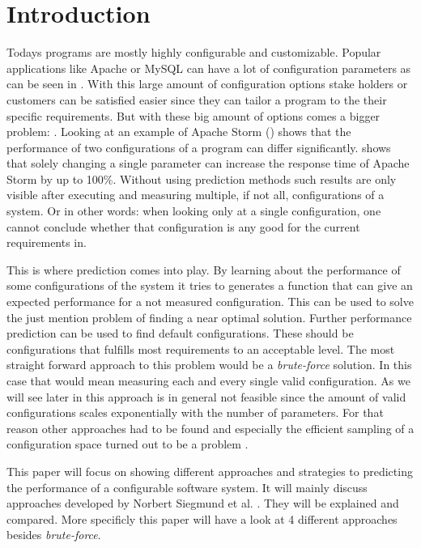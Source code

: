 
\section{Introduction} \label{sec:introduction}
Todays programs are mostly highly configurable and customizable. Popular applications like Apache or MySQL can have a lot of configuration parameters as can be seen in . With this large amount of  configuration options stake holders or customers can be satisfied easier since they can tailor a program to the their specific requirements. But with these big amount of options comes a bigger problem: . Looking at an example of Apache Storm () shows that the performance of two configurations of a program can differ significantly.  shows that solely changing a single parameter can increase the response time of Apache Storm by up to 100\%. Without using prediction methods such results are only visible after executing and measuring multiple, if not all, configurations of a system. Or in other words: when looking only at a single configuration, one cannot conclude whether that configuration is any good for the current requirements in.

This is where prediction comes into play. By learning about the performance of some configurations of the system it tries to generates a function that can give an expected performance for a not measured configuration. This can be used to solve the just mention problem of finding a near optimal solution.
Further performance prediction can be used to find default configurations. These should be configurations that fulfills most requirements to an acceptable level. 
The most straight forward  approach to this problem would be a \textit{brute-force} solution. In this case that would mean measuring each and every single valid configuration. As we will see later in  this approach is in general not feasible since the amount of valid configurations scales exponentially with the number of parameters. For that reason other approaches had to be found and especially the efficient sampling of a configuration space turned out to be a problem \cite{CostEfficientSampling_Gou_Siegmund_2015}. 

This paper will focus on showing different approaches and strategies to predicting the performance of a configurable software system. It will mainly discuss approaches developed by Norbert Siegmund et al. \cite{AutomatedFeatureDetectionSiegmund2012,VariabilityAwarePerformancePredictionJianmeiSigmundApel,CostEfficientSampling_Gou_Siegmund_2015, DistanceBasedSampling2019}. They will be explained and compared. More specificly this paper will have a look at 4 different approaches besides \textit{brute-force}.

